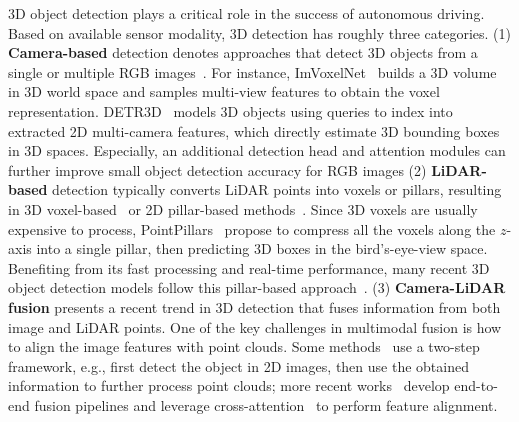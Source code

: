 \documentclass[10pt,twocolumn,letterpaper]{article}
\begin{document}
3D object detection plays a critical role in the success of autonomous driving.
Based on available sensor modality, 3D detection has roughly three categories.
(1) \textbf{Camera-based} detection denotes approaches that detect 3D objects from a single or multiple RGB images~\cite{reading2021categorical,roddick2018orthographic,rukhovich2022imvoxelnet,huang2021bevdet,wang2022detr3d}. For instance, ImVoxelNet~\cite{rukhovich2022imvoxelnet} builds a 3D volume in 3D world space and samples multi-view features to obtain the voxel representation. DETR3D~\cite{wang2022detr3d} models 3D objects using queries to index into extracted 2D multi-camera features, which directly estimate 3D bounding boxes in 3D spaces. Especially, an additional detection head and  attention modules can further improve small object detection accuracy for RGB images\cite{liu2022yolov5}
(2) \textbf{LiDAR-based} detection typically converts LiDAR points into voxels or pillars, resulting in 3D voxel-based~\cite{zhou2018voxelnet,yan2018second} or 2D pillar-based methods~\cite{lang2019pointpillars,yang2018pixor}. Since 3D voxels are usually expensive to process, PointPillars~\cite{lang2019pointpillars} propose to compress all the voxels along the $z$-axis into a single pillar, then predicting 3D boxes in the bird's-eye-view space. Benefiting from its fast processing and real-time performance, many recent 3D object detection models follow this pillar-based approach~\cite{wang2020pillar,fan2022embracing}.
(3) \textbf{Camera-LiDAR fusion} presents a recent trend in 3D detection that fuses information from both image and LiDAR points. One of the key challenges in multimodal fusion is how to align the image features with point clouds. Some methods~\cite{qi2018frustum, vora2020pointpainting} use a two-step framework, e.g., first detect the object in 2D images, then use the obtained information to further process point clouds; more recent works~\cite{prakash2021multi,li2022deepfusion} develop end-to-end fusion pipelines and leverage cross-attention~\cite{vaswani2017attention} to perform feature alignment.
\end{document}
